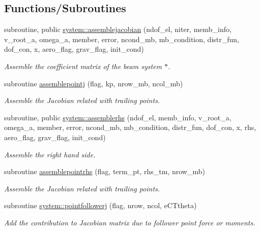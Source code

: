 \subsection*{Functions/\+Subroutines}
\begin{DoxyCompactItemize}
\item 
subroutine, public \hyperlink{namespacesystem_aca86d62bded01533c138c9e2298cc804}{system\+::assemblejacobian} (ndof\+\_\+el, niter, memb\+\_\+info, v\+\_\+root\+\_\+a, omega\+\_\+a, member, error, ncond\+\_\+mb, mb\+\_\+condition, distr\+\_\+fun, dof\+\_\+con, x, aero\+\_\+flag, grav\+\_\+flag, init\+\_\+cond)
\begin{DoxyCompactList}\small\item\em Assemble the coefficient matrix of the beam system $\ast$. \end{DoxyCompactList}\item 
subroutine \hyperlink{_system_8f90_a199b01538558da4f55d04fcfa95295d7}{assemblepointj} (flag, kp, nrow\+\_\+mb, ncol\+\_\+mb)
\begin{DoxyCompactList}\small\item\em Assemble the Jacobian related with trailing points. \end{DoxyCompactList}\item 
subroutine, public \hyperlink{namespacesystem_a442f9666f95d674029a7fbe213b47f8a}{system\+::assemblerhs} (ndof\+\_\+el, memb\+\_\+info, v\+\_\+root\+\_\+a, omega\+\_\+a, member, error, ncond\+\_\+mb, mb\+\_\+condition, distr\+\_\+fun, dof\+\_\+con, x, rhs, aero\+\_\+flag, grav\+\_\+flag, init\+\_\+cond)
\begin{DoxyCompactList}\small\item\em Assemble the right hand side. \end{DoxyCompactList}\item 
subroutine \hyperlink{_system_8f90_a1f135ebbf58f2a5866381eee1a796446}{assemblepointrhs} (flag, term\+\_\+pt, rhs\+\_\+tm, nrow\+\_\+mb)
\begin{DoxyCompactList}\small\item\em Assemble the Jacobian related with trailing points. \end{DoxyCompactList}\item 
subroutine \hyperlink{namespacesystem_a048a8c1a606cebab7e33f3ae1877c31a}{system\+::pointfollowerj} (flag, nrow, ncol, e\+C\+Ttheta)
\begin{DoxyCompactList}\small\item\em Add the contribution to Jacobian matrix due to follower point force or moments. \end{DoxyCompactList}\end{DoxyCompactItemize}
